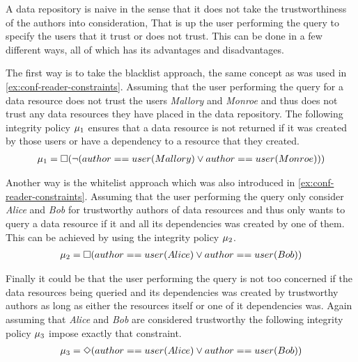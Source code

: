 \begin{example}
A data repository is naive in the sense that it does not take the trustworthiness of the authors into consideration, That is up the user performing the query to specify the users that it trust or does not trust. This can be done in a few different ways, all of which has its advantages and disadvantages.

The first way is to take the blacklist approach, the same concept as was used in \autoref{ex:conf-reader-constraints}. Assuming that the user performing the query for a data resource does not trust the users \emph{Mallory} and \emph{Monroe} and thus does not trust any data resources they have placed in the data repository. The following integrity policy $\mu_1$ ensures that a data resource is not returned if it was created by those users or have a dependency to a resource that they created.
\begin{align*}
    \mu_1 = \square( \lnot (author==user(Mallory) \lor author==user(Monroe)))
\end{align*}

Another way is the whitelist approach which was also introduced in \autoref{ex:conf-reader-constraints}. Assuming that the user performing the query only consider \emph{Alice} and \emph{Bob} for trustworthy authors of data resources and thus only wants to query a data resource if it and all its dependencies was created by one of them. This can be achieved by using the integrity policy $\mu_2$.
\begin{align*}
    \mu_2 = \square(author==user(Alice) \lor author==user(Bob))
\end{align*}

Finally it could be that the user performing the query is not too concerned if the data resources being queried and its dependencies was created by trustworthy authors as long as either the resources itself or one of it dependencies was. Again assuming that \emph{Alice} and \emph{Bob} are considered trustworthy the following integrity policy $\mu_3$ impose exactly that constraint.
\begin{align*}
    \mu_3 = \Diamond(author==user(Alice) \lor author==user(Bob))
\end{align*}
\end{example}